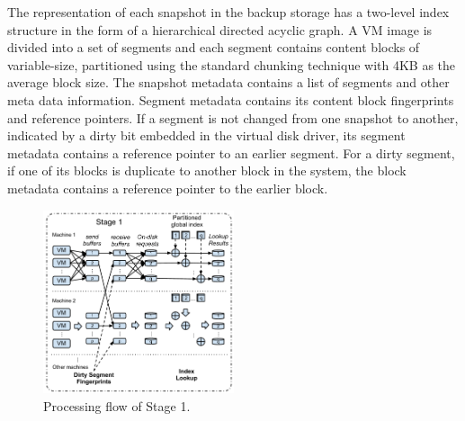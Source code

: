The representation of each snapshot in the backup storage
has a two-level index structure in the form of a hierarchical
directed acyclic graph.%
A VM image is divided into a set of segments and each  segment contains 
content blocks of variable-size, partitioned using
the standard chunking technique with 4KB as the average block size. 
The snapshot metadata  contains a list of segments and other meta data information.
Segment metadata  contains its  content block fingerprints and reference pointers. 
If a segment is not changed from one snapshot to another, indicated by a dirty bit embedded in the virtual disk driver, 
its segment metadata contains a reference pointer to an earlier segment.
For a dirty segment, if one of its blocks is duplicate to another block in the system,  
the block metadata contains a reference pointer to the earlier block.






\begin{figure}[th]
\centering
\includegraphics[width=0.5\textwidth]{images/Stage1.pdf}
\caption{Processing flow of Stage 1.}
\label{fig:stage1}
\end{figure}

